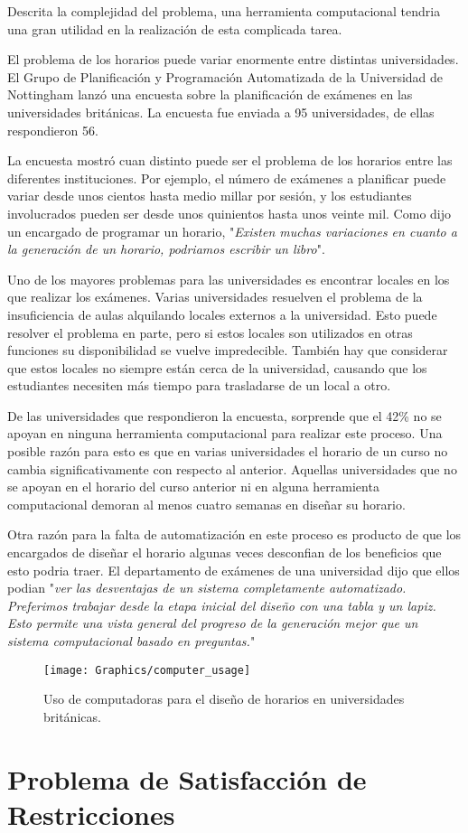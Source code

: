 Descrita la complejidad del problema, una herramienta computacional tendria una gran utilidad en la realización
de esta complicada tarea.

El problema de los horarios puede variar enormente entre distintas universidades. El Grupo de Planificación
y Programación Automatizada de la Universidad de Nottingham lanzó una encuesta \cite{survey of University of Nottingham} sobre la planificación de exámenes en las universidades británicas. La encuesta fue enviada a
95 universidades, de ellas respondieron 56.

La encuesta mostró cuan distinto puede ser el problema de los horarios entre las diferentes instituciones.
Por ejemplo, el número de exámenes a planificar puede variar desde unos cientos hasta medio millar por sesión,
y los estudiantes involucrados pueden ser desde unos quinientos hasta unos veinte mil. Como dijo un
encargado de programar un horario, "\emph{Existen muchas variaciones en cuanto a la generación de un horario,
podriamos escribir un libro}".

Uno de los mayores problemas para las universidades es encontrar locales en los que realizar los exámenes.
Varias universidades resuelven el problema de la insuficiencia de aulas alquilando locales externos a la
universidad. Esto puede resolver el problema en parte, pero si estos locales son utilizados en otras funciones
su disponibilidad se vuelve impredecible. También hay que considerar que estos locales no siempre están cerca de
la universidad, causando que los estudiantes necesiten más tiempo para trasladarse de un local a otro.

De las universidades que respondieron la encuesta, sorprende que el 42\% no se apoyan en ninguna herramienta
computacional para realizar este proceso. Una posible razón para esto es que en varias universidades el
horario de un curso no cambia significativamente con respecto al anterior. Aquellas universidades que no
se apoyan en el horario del curso anterior ni en alguna herramienta computacional demoran al menos cuatro
semanas en diseñar su horario.

Otra razón para la falta de automatización en este proceso es producto de que los encargados de diseñar el horario
algunas veces desconfian de los beneficios que esto podria traer. El departamento de exámenes de una universidad
dijo que ellos podian "\emph{ver las desventajas de un sistema completamente automatizado. Preferimos trabajar
desde la etapa inicial del diseño con una tabla y un lapiz. Esto permite una vista general del progreso de la
generación mejor que un sistema computacional basado en preguntas.}"

\begin{figure}
	\begin{center}
		\texttt{[image: Graphics/computer\_usage]}
		\caption{Uso de computadoras para el diseño de horarios en universidades británicas.}
	\end{center}
\end{figure}

\section{Problema de Satisfacción de Restricciones}
